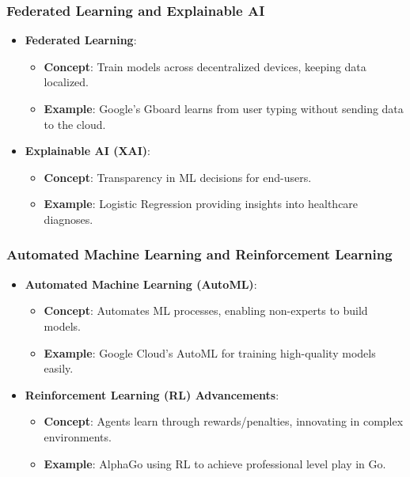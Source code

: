 \documentclass[aspectratio=169]{beamer}
\begin{document}
\begin{frame}[fragile]
    \frametitle{Federated Learning and Explainable AI}
    \begin{itemize}
        \item \textbf{Federated Learning}:
            \begin{itemize}
                \item \textbf{Concept}: Train models across decentralized devices, keeping data localized.
                \item \textbf{Example}: Google’s Gboard learns from user typing without sending data to the cloud.
            \end{itemize}
        \item \textbf{Explainable AI (XAI)}:
            \begin{itemize}
                \item \textbf{Concept}: Transparency in ML decisions for end-users.
                \item \textbf{Example}: Logistic Regression providing insights into healthcare diagnoses.
            \end{itemize}
    \end{itemize}
\end{frame}

\begin{frame}[fragile]
    \frametitle{Automated Machine Learning and Reinforcement Learning}
    \begin{itemize}
        \item \textbf{Automated Machine Learning (AutoML)}:
            \begin{itemize}
                \item \textbf{Concept}: Automates ML processes, enabling non-experts to build models.
                \item \textbf{Example}: Google Cloud’s AutoML for training high-quality models easily.
            \end{itemize}
        \item \textbf{Reinforcement Learning (RL) Advancements}:
            \begin{itemize}
                \item \textbf{Concept}: Agents learn through rewards/penalties, innovating in complex environments.
                \item \textbf{Example}: AlphaGo using RL to achieve professional level play in Go.
            \end{itemize}
    \end{itemize}
\end{frame}
\end{document}
